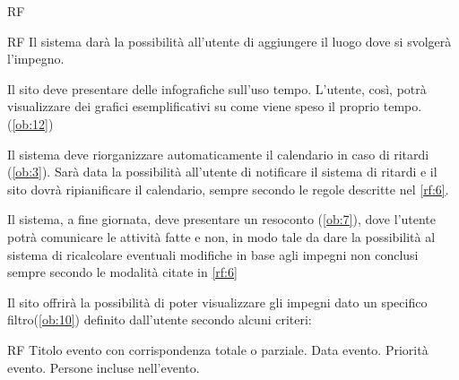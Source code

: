 \begin {listaPersonale}{RF}
\begin{listaPersonale2}{RF}
Il sistema darà la possibilità all'utente di aggiungere il luogo dove si svolgerà l'impegno.
\end{listaPersonale2}

Il sito deve presentare delle infografiche sull'uso tempo. L'utente, così, potrà
visualizzare dei grafici esemplificativi su come viene speso il proprio tempo. 
(\ref{ob:12})

Il sistema deve riorganizzare automaticamente il calendario in caso di ritardi (\ref{ob:3}). Sarà data la possibilità all'utente di notificare il sistema di ritardi e il sito dovrà ripianificare il calendario, sempre secondo le regole descritte nel \ref{rf:6}.

Il sistema, a fine giornata, deve presentare un resoconto (\ref{ob:7}), dove l'utente potrà
comunicare le attività fatte e non, in modo tale da dare la possibilità al sistema di 
ricalcolare eventuali modifiche in base agli impegni non conclusi sempre secondo le modalità citate in \ref{rf:6}

Il sito offrirà la possibilità di poter visualizzare gli impegni dato un specifico filtro(\ref{ob:10}) definito dall'utente secondo alcuni criteri: 
\begin{listaPersonale2}{RF}
 Titolo evento con corrispondenza totale o parziale.
 Data evento.
 Priorità evento.
 Persone incluse nell'evento.
\end{listaPersonale2}
\end{listaPersonale}